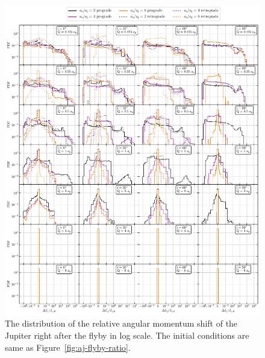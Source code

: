 \documentclass[twocolumn]{aastex63}
\newcommand*\fgr[1]{Figure~\ref{#1}}
\begin{document}
\begin{figure}
    \includegraphics[width=\textwidth]{figs/dLj-flyby-ratio.pdf}
    \caption{The distribution of the relative angular momentum shift of the Jupiter right after the flyby in log scale. The initial conditions are same as \fgr{fig:aj-flyby-ratio}.} 
    \label{fig:dLj-flyby-ratio}
\end{figure}
\end{document}
